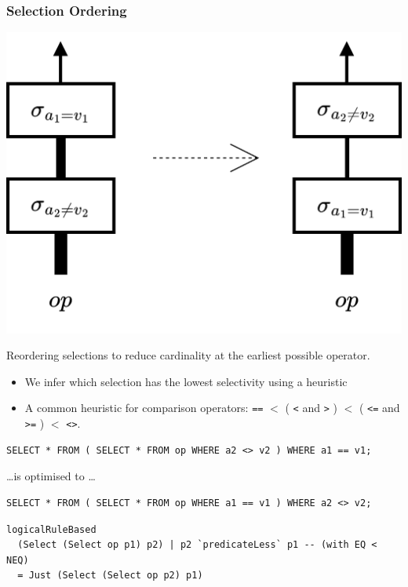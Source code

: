 \subsubsection{Selection Ordering}
\begin{center}
    \includegraphics[width=.4\textwidth]{optimisation/images/selection_reordering.drawio.png}
\end{center}
Reordering selections to reduce cardinality at the earliest possible operator. 
\begin{itemize}
    \item We infer which selection has the lowest selectivity using a heuristic
    \item A common heuristic for comparison operators: \texttt{==} $ < $ ( \texttt{<} and \texttt{>} ) $ < $ ( \texttt{<=} and \texttt{>=} ) $ < $ \texttt{<>}.
\end{itemize}
\begin{verbatim}
SELECT * FROM ( SELECT * FROM op WHERE a2 <> v2 ) WHERE a1 == v1; 
\end{verbatim}
\dots is optimised to \dots
\begin{verbatim}
SELECT * FROM ( SELECT * FROM op WHERE a1 == v1 ) WHERE a2 <> v2;
\end{verbatim}
\begin{verbatim}
logicalRuleBased 
  (Select (Select op p1) p2) | p2 `predicateLess` p1 -- (with EQ < NEQ) 
  = Just (Select (Select op p2) p1)
\end{verbatim}

